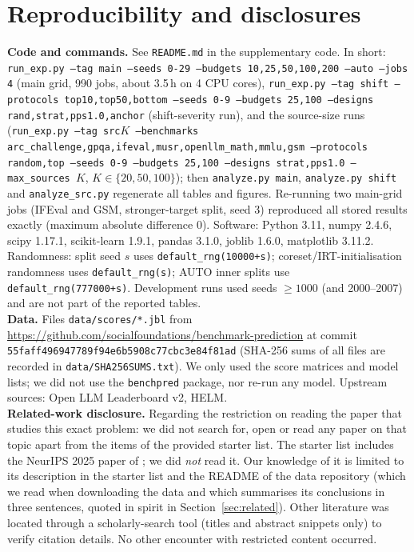 \section{Reproducibility and disclosures}\label{app:repro}
\textbf{Code and commands.} See \texttt{README.md} in the supplementary code. In short: \texttt{run\_exp.py --tag main --seeds 0-29 --budgets 10,25,50,100,200 --auto --jobs 4} (main grid, 990 jobs, about 3.5\,h on 4 CPU cores), \texttt{run\_exp.py --tag shift --protocols top10,top50,bottom --seeds 0-9 --budgets 25,100 --designs rand,strat,pps1.0,anchor} (shift-severity run), and the source-size runs (\texttt{run\_exp.py --tag src$K$ --benchmarks arc\_challenge,gpqa,ifeval,musr,openllm\_math,mmlu,gsm --protocols random,top --seeds 0-9 --budgets 25,100 --designs strat,pps1.0 --max\_sources $K$}, $K\in\{20,50,100\}$); then \texttt{analyze.py main}, \texttt{analyze.py shift} and \texttt{analyze\_src.py} regenerate all tables and figures. Re-running two main-grid jobs (IFEval and GSM, stronger-target split, seed 3) reproduced all stored results exactly (maximum absolute difference 0). Software: Python 3.11, numpy 2.4.6, scipy 1.17.1, scikit-learn 1.9.1, pandas 3.1.0, joblib 1.6.0, matplotlib 3.11.2. Randomness: split seed $s$ uses \texttt{default\_rng(10000+s)}; coreset/IRT-initialisation randomness uses \texttt{default\_rng(s)}; AUTO inner splits use \texttt{default\_rng(777000+s)}. Development runs used seeds $\ge1000$ (and 2000--2007) and are not part of the reported tables.\\
\textbf{Data.} Files \texttt{data/scores/*.jbl} from \url{https://github.com/socialfoundations/benchmark-prediction} at commit \texttt{55faff496947789f94e6b5908c77cbc3e84f81ad} (SHA-256 sums of all files are recorded in \texttt{data/SHA256SUMS.txt}). We only used the score matrices and model lists; we did not use the \texttt{benchpred} package, nor re-run any model. Upstream sources: Open LLM Leaderboard v2, HELM.\\
\textbf{Related-work disclosure.} Regarding the restriction on reading the paper that studies this exact problem: we did not search for, open or read any paper on that topic apart from the items of the provided starter list. The starter list includes the NeurIPS 2025 paper of \citet{zhang2025misses}; we did \emph{not} read it. Our knowledge of it is limited to its description in the starter list and the README of the data repository (which we read when downloading the data and which summarises its conclusions in three sentences, quoted in spirit in Section~\ref{sec:related}). Other literature was located through a scholarly-search tool (titles and abstract snippets only) to verify citation details. No other encounter with restricted content occurred.\\
